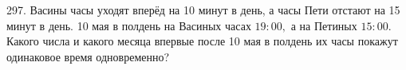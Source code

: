 297. Васины часы уходят вперёд на 10 минут в день, а часы Пети отстают на 15 минут в день. 10 мая в полдень на Васиных часах $19:00,$ а на Петиных $15:00.$ Какого числа и какого месяца впервые после 10 мая в полдень их часы покажут одинаковое время одновременно?\\
